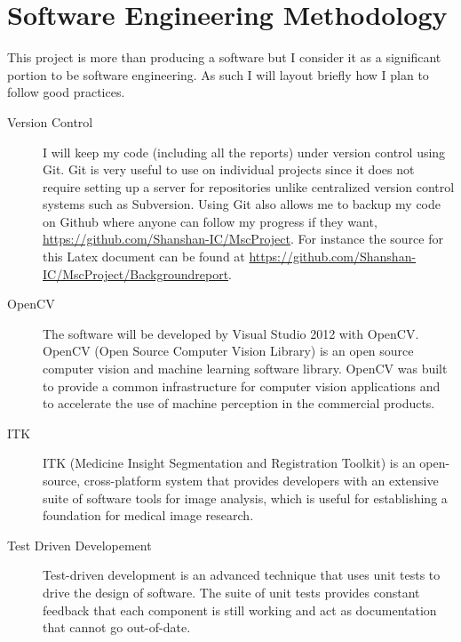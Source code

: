 \appendix
\chapter{Software Engineering Methodology} \label{app:sem}
This project is more than producing a software but I consider it as a significant portion to be software engineering.  As such I will layout briefly how I plan to follow good practices. 

\begin{description}
\item[Version Control] I will keep my code (including all the reports) under version control using Git. Git is very useful to use on individual projects since it does not require setting up a server for repositories unlike centralized version control systems such as Subversion. Using Git also allows me to backup my code on Github where anyone can follow my progress if they want, \url{https://github.com/Shanshan-IC/MscProject}. 
For instance the source for this Latex document can be found at \url{https://github.com/Shanshan-IC/MscProject/Backgroundreport}.

\item[OpenCV] The software will be developed by Visual Studio 2012 with OpenCV. OpenCV (Open Source Computer Vision Library) is an open source computer vision and machine learning software library. OpenCV was built to provide a common infrastructure for computer vision applications and to accelerate the use of machine perception in the commercial products.

\item[ITK] ITK (Medicine Insight Segmentation and Registration Toolkit) is an open-source, cross-platform system that provides developers with an extensive suite of software tools for image analysis, which is useful for establishing a foundation for medical image research.

\item[Test Driven Developement] Test-driven development is an advanced technique that uses unit tests to drive the design of software. The suite of unit tests provides constant feedback that each component is still working and act as documentation that cannot go out-of-date.

\end{description}
